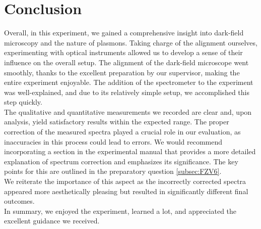 \section{\label{sec:fazit}Conclusion}
Overall, in this experiment, we gained a comprehensive insight into dark-field microscopy 
and the nature of plasmons. 
Taking charge of the alignment ourselves, experimenting with optical instruments allowed 
us to develop a sense of their influence on the overall setup. 
The alignment of the dark-field microscope went smoothly, thanks to the excellent preparation 
by our supervisor, making the entire experiment enjoyable. 
The addition of the spectrometer to the experiment was well-explained, 
and due to its relatively simple setup, we accomplished this step quickly. \\
The qualitative and quantitative measurements we recorded are clear and, upon analysis, 
yield satisfactory results within the expected range. 
The proper correction of the measured spectra played a crucial role in our evaluation, 
as inaccuracies in this process could lead to errors. 
We would recommend incorporating a section in the experimental manual that provides 
a more detailed explanation of spectrum correction and emphasizes its significance. 
The key points for this are outlined in the preparatory question \ref{subsec:FZV6}. \\
We reiterate the importance of this aspect as the incorrectly corrected spectra appeared 
more aesthetically pleasing but resulted in significantly different final outcomes. \\
In summary, we enjoyed the experiment, learned a lot, and appreciated the excellent guidance we received.





